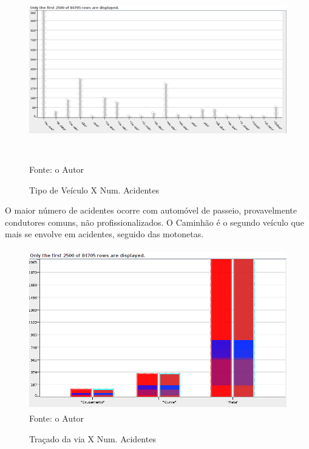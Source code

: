 \pagebreak

\begin{figure}[ht]
\begin{center}
\caption{Tipo de Veículo X Num. Acidentes}
\includegraphics[width=150mm, height=80mm]{Figuras/Preprocess/TipoVeiculoXNumAciden.png}\\
\tiny Fonte: o Autor
\end{center}
\end{figure}

O maior número de acidentes ocorre com automóvel de passeio, provavelmente condutores comuns, não profissionalizados.
O Caminhão é o segundo veículo que mais se envolve em acidentes, seguido das motonetas. 

\begin{figure}[ht]
\begin{center}
\caption{Traçado da via X Num. Acidentes}
\includegraphics[width=120mm, height=70mm]{Figuras/Preprocess/TracadoViaNumAcident.png}\\
\tiny Fonte: o Autor
\end{center}
\end{figure}

